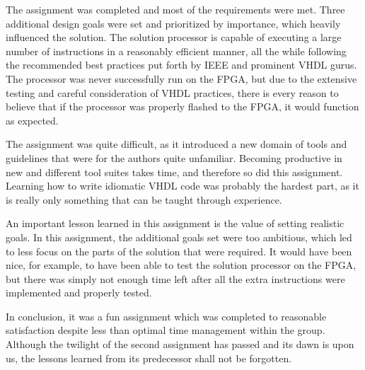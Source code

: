 The assignment was completed and most of the requirements were met.
Three additional design goals were set and prioritized by importance, which heavily influenced the solution.
The solution processor is capable of executing a large number of instructions in a reasonably efficient manner, all the while following the recommended best practices put forth by IEEE and prominent VHDL gurus.
The processor was never successfully run on the FPGA, but due to the extensive testing and careful consideration of VHDL practices, there is every reason to believe that if the processor was properly flashed to the FPGA, it would function as expected.

The assignment was quite difficult, as it introduced a new domain of tools and guidelines that were for the authors quite unfamiliar.
Becoming productive in new and different tool suites takes time, and therefore so did this assignment.
Learning how to write idiomatic VHDL code was probably the hardest part, as it is really only something that can be taught through experience.

An important lesson learned in this assignment is the value of setting realistic goals.
In this assignment, the additional goals set were too ambitious, which led to less focus on the parts of the solution that were required.
It would have been nice, for example, to have been able to test the solution processor on the FPGA, but there was simply not enough time left after all the extra instructions were implemented and properly tested.

In conclusion, it was a fun assignment which was completed to reasonable satisfaction despite less than optimal time management within the group.
Although the twilight of the second assignment has passed and its dawn is upon us, the lessons learned from its predecessor shall not be forgotten.
